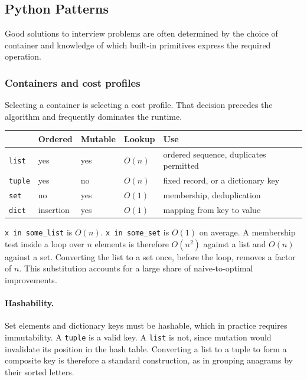 \subsection{Python Patterns}

Good solutions to interview problems are often determined by the choice of container and knowledge of which built-in primitives express the required operation.

\subsubsection*{Containers and cost profiles}

Selecting a container is selecting a cost profile. That decision precedes the
algorithm and frequently dominates the runtime.

\begin{center}
\begin{tabular}{lllll}
\toprule
& \textbf{Ordered} & \textbf{Mutable} & \textbf{Lookup} & \textbf{Use} \\
\midrule
\texttt{list}  & yes & yes & $O(n)$ & ordered sequence, duplicates permitted \\
\texttt{tuple} & yes & no  & $O(n)$ & fixed record, or a dictionary key \\
\texttt{set}   & no  & yes & $O(1)$ & membership, deduplication \\
\texttt{dict}  & insertion & yes & $O(1)$ & mapping from key to value \\
\bottomrule
\end{tabular}
\end{center}

\medskip

\begin{keybox}
\texttt{x in some\_list} is $O(n)$. \texttt{x in some\_set} is $O(1)$ on
average. A membership test inside a loop over $n$ elements is therefore
$O(n^2)$ against a list and $O(n)$ against a set. Converting the list to a set
once, before the loop, removes a factor of $n$. This substitution accounts for
a large share of naive-to-optimal improvements.
\end{keybox}

\paragraph{Hashability.} Set elements and dictionary keys must be hashable,
which in practice requires immutability. A \texttt{tuple} is a valid key. A
\texttt{list} is not, since mutation would invalidate its position in the hash
table. Converting a list to a tuple to form a composite key is therefore a
standard construction, as in grouping anagrams by their sorted letters.

